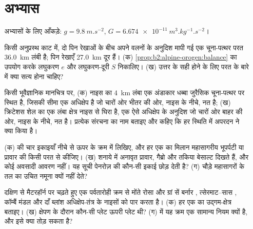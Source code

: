 \section*{अभ्यास}\label{sec:b2:alpine-orogen:exercises}

अभ्यासों के लिए आँकड़े: $g = \qty{9.8}{m.s^{-2}}$,
$G = \qty{6.674e-11}{m^3.kg^{-1}.s^{-2}}$।

\begin{exercise}[$\star$]\label{exo:b2:alpine-orogen:1}
किसी अनुप्रस्थ काट में, दो पिन रेखाओं के बीच अपने वलनों के अनुदिश मापी गई एक चूना-पत्थर परत
\qty{36.0}{km} लंबी है; पिन रेखाएँ \qty{27.0}{km} दूर हैं। (क)
\cref{prop:b2:alpine-orogen:balance} का उपयोग करके लघुकरण $e$ और लघुकरण-दूरी
$S$ निकालिए। (ख) उत्तर के सही होने के लिए परत के बारे में क्या सत्य होना चाहिए?
\end{exercise}

\begin{exercise}[$\star$]\label{exo:b2:alpine-orogen:2}
किसी भूवैज्ञानिक मानचित्र पर, (क) नाइस का \qty{4}{km} लंबा एक अंडाकार धब्बा जुरैसिक
चूना-पत्थर पर स्थित है, जिसकी सीमा एक अधिक्षेप है जो चारों ओर भीतर की ओर, नाइस के नीचे, नत है; (ख)
क्रिटेशस शेल का एक लंबा क्षेत्र नाइस से घिरा है, एक ऐसे अधिक्षेप के अनुदिश जो
चारों ओर बाहर की ओर, नाइस के नीचे, नत है। प्रत्येक संरचना का नाम बताइए और कहिए कि हर स्थिति में
अपरदन ने क्या किया है।
\end{exercise}

\begin{exercise}[$\star$]\label{exo:b2:alpine-orogen:3}
(क)  की चार इकाइयाँ नीचे से ऊपर के क्रम में लिखिए, और हर एक का मिलान
महासागरीय भूपर्पटी या प्रावार की किसी परत से कीजिए। (ख) शनाये  में अनावृत
प्रावार, गैब्रो और तकिया बेसाल्ट दिखते हैं, और कोई अवसादी आवरण नहीं। यह सूची पेनरोज़ की
कौन-सी इकाई छोड़ देती है? (ग)  चौड़े महासागरों के तल का उचित नमूना
क्यों नहीं देते?
\end{exercise}

\begin{exercise}[$\star$]\label{exo:b2:alpine-orogen:4}
दक्षिण से मैटरहॉर्न पर चढ़ते हुए एक पर्वतारोही क्रम से मोंते रोसा और
ग्रां सें बर्नार , त्सेरमाट--सास , कॉम्बैं मंडल और
दाँ ब्लांश अधिक्षेप-तंत्र के नाइसों को पार करता है। (क) हर एक का उद्गम-क्षेत्र बताइए। (ख) क्षेपण के दौरान
कौन-सी प्लेट ऊपरी प्लेट थी? (ग)  में यह क्रम एक सामान्य नियम क्यों है,
और इसे क्या तोड़ सकता है?
\end{exercise}

